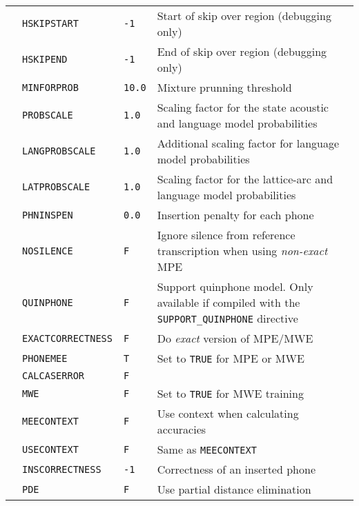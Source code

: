 \begin{center}
\begin{supertabular}{|p{1.8cm}|l|l|p{6.6cm}|}
 & \texttt{HSKIPSTART} & \texttt{-1} & Start of skip over region (debugging only) \\ 
  & \texttt{HSKIPEND} & \texttt{-1} & End of skip over region (debugging only) \\ \hline


  & \texttt{MINFORPROB} & \texttt{10.0} & Mixture prunning threshold \\ 
  & \texttt{PROBSCALE} & \texttt{1.0} & Scaling factor for the state acoustic and language model probabilities \\ 
  & \texttt{LANGPROBSCALE} & \texttt{1.0} & Additional scaling factor for language model probabilities \\ 
  & \texttt{LATPROBSCALE} & \texttt{1.0} & Scaling factor for the lattice-arc and language model probabilities \\ 
  & \texttt{PHNINSPEN} & \texttt{0.0} & Insertion penalty for each phone \\ 
   & \texttt{NOSILENCE} & \texttt{F} & Ignore silence from reference transcription when using \emph{non-exact} MPE \\ 
  & \texttt{QUINPHONE} & \texttt{F} & Support quinphone model. Only available if compiled with the \texttt{SUPPORT\_QUINPHONE} directive \\ 
  & \texttt{EXACTCORRECTNESS} & \texttt{F} & Do \emph{exact} version of MPE/MWE \\ 
  & \texttt{PHONEMEE} & \texttt{T} & Set to \texttt{TRUE} for MPE or MWE \\ 
  & \texttt{CALCASERROR} & \texttt{F} &  \\ 
  & \texttt{MWE} & \texttt{F} & Set to \texttt{TRUE} for MWE training \\ 
  & \texttt{MEECONTEXT} & \texttt{F} & Use context when calculating accuracies \\ 
  & \texttt{USECONTEXT} & \texttt{F} & Same as \texttt{MEECONTEXT} \\ 
  & \texttt{INSCORRECTNESS} & \texttt{-1} & Correctness of an inserted phone \\ 
  & \texttt{PDE} & \texttt{F} & Use partial distance elimination \\ \hline


\end{supertabular}
\end{center}

